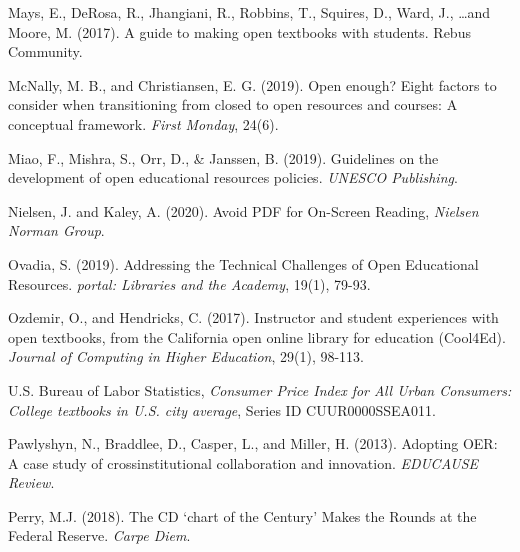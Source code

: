 \documentclass[11pt]{article}
\newcommand{\alink}[2]{\href{#1}{\textcolor{blue}{#2}}}
\begin{document}
\begin{thebibliography}{99}
   Mays, E., DeRosa, R., Jhangiani, R., Robbins, T., Squires, D., Ward, J., \ldots and Moore, M. (2017). A guide to making open textbooks with students. Rebus Community.

   McNally, M. B., and Christiansen, E. G. (2019). Open enough? Eight factors to consider when transitioning from closed to open resources and courses: A conceptual framework. {\em First Monday}, 24(6).%

   Miao, F., Mishra, S., Orr, D., \& Janssen, B. (2019). Guidelines on the development of open educational resources policies. {\em UNESCO Publishing}.%

   Nielsen, J. and Kaley, A. (2020).  Avoid PDF for On-Screen Reading, {\em Nielsen Norman Group}.%
  
   Ovadia, S. (2019). Addressing the Technical Challenges of Open Educational Resources.  {\em portal: Libraries and the Academy}, 19(1), 79-93.%

   Ozdemir, O., and Hendricks, C. (2017). Instructor and student experiences with open textbooks, from the California open online library for education (Cool4Ed). {\em Journal of Computing in Higher Education}, 29(1), 98-113.

   U.S. Bureau of Labor Statistics, {\em Consumer Price Index for All Urban Consumers: College textbooks in U.S. city average}, Series ID CUUR0000SSEA011.%

   Pawlyshyn, N., Braddlee, D., Casper, L., and Miller, H. (2013). Adopting OER: A case study of crossinstitutional collaboration and innovation. {\em EDUCAUSE Review}.

   Perry, M.J. (2018). The CD `chart of the Century' Makes the Rounds at the Federal Reserve. {\em Carpe Diem}.%


\end{thebibliography}
\end{document}
